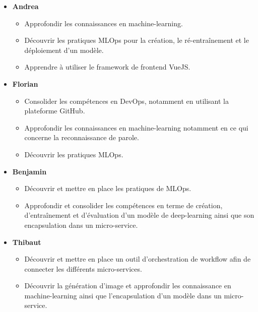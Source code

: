 \begin{itemize}
    \item \textbf{Andrea}
    \begin{itemize}
        \item Approfondir les connaissances en machine-learning.
        \item Découvrir les pratiques MLOps pour la création, le ré-entraînement et le déploiement d’un modèle.
        \item Apprendre à utiliser le framework de frontend VueJS.
    \end{itemize}
    \item \textbf{Florian}
    \begin{itemize}
        \item Consolider les compétences en DevOps, notamment en utilisant la plateforme GitHub.
        \item Approfondir les connaissances en machine-learning notamment en ce qui concerne la reconnaissance de parole.
        \item Découvrir les pratiques MLOps.
    \end{itemize}
    \item \textbf{Benjamin}
    \begin{itemize}
        \item Découvrir et mettre en place les pratiques de MLOps.
        \item  Approfondir et consolider les compétences en terme de création, d’entraînement et d’évaluation d’un modèle de deep-learning ainsi que son encapsulation dans un micro-service.
    \end{itemize}
    \item \textbf{Thibaut}
    \begin{itemize}
        \item Découvrir et mettre en place un outil d’orchestration de workflow afin de connecter les différents micro-services.
        \item Découvrir la génération d’image et approfondir les connaissance en machine-learning ainsi que l’encapsulation d’un modèle dans un micro-service.
    \end{itemize}    
\end{itemize}





